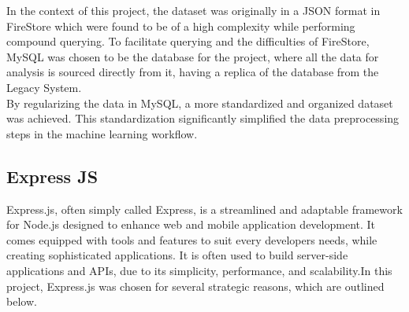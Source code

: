In the context of this project, the dataset was originally in a JSON format in FireStore which were found to be of a high complexity while performing compound querying. To facilitate querying and the 
difficulties of FireStore, MySQL was chosen to be the database for the project, where all the data for analysis is sourced directly from it, having a replica of the database
from the Legacy System. \\
By regularizing the data in MySQL, a more standardized and organized dataset was achieved. This standardization significantly simplified the data preprocessing steps in the machine learning workflow.


\subsection{Express JS}
Express.js, often simply called Express, is a streamlined and adaptable framework for Node.js designed to enhance web and mobile application development. It comes equipped 
with tools and features to suit every developers needs, while creating sophisticated applications.
It is often used to build server-side applications and APIs, due to its simplicity, performance, and scalability.In this project, Express.js was chosen for several strategic reasons, which are outlined below.\cite{express}

